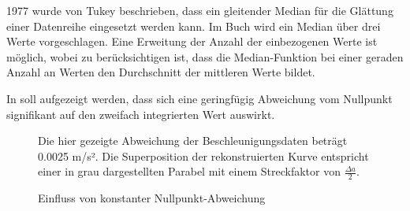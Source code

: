1977 wurde von Tukey beschrieben, dass ein gleitender Median für die Glättung einer Datenreihe eingesetzt werden kann. %
Im Buch wird ein Median über drei Werte vorgeschlagen. Eine Erweitung der Anzahl der einbezogenen Werte ist möglich, wobei zu berücksichtigen ist, dass die Median-Funktion bei einer geraden Anzahl an Werten den Durchschnitt der mittleren Werte bildet.


\FloatBarrier
{}
In  soll aufgezeigt werden, dass sich eine geringfügig Abweichung vom Nullpunkt signifikant auf den zweifach integrierten Wert auswirkt.

\begin{figure}[ht!]
\vspace{0.25cm}
\begin{center}
\caption{Einfluss von konstanter Nullpunkt-Abweichung}
\label{fig:SzeneOffset}
\end{center}

\vspace{0.25cm}
Die hier gezeigte Abweichung der Beschleunigungsdaten beträgt 0.0025 m/s². Die Superposition der rekonstruierten Kurve entspricht einer in grau dargestellten Parabel mit einem Streckfaktor von $\frac{\Delta a}{2}$.
\end{figure}










